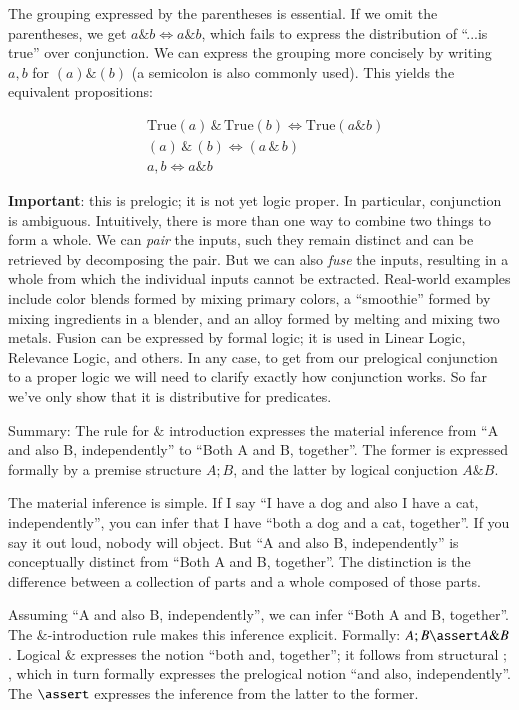 The grouping expressed by the parentheses is essential. If we omit the
parentheses, we get \(a\& b\iff a\&b\), which fails to express the
distribution of ``...is true'' over conjunction. We can express the
grouping more concisely by writing \(a,b\) for \((a)\&(b)\) (a
semicolon is also commonly used). This yields the equivalent
propositions:

\begin{align}
  & \text{True}(a)\,\&\,\text{True}(b)\iff \text{True}(a\&b) \\
  & (a)\,\&\,(b)\iff (a\,\&\,b) \\
  & a,b\iff a\&b
\end{align}

\textbf{Important}: this is prelogic; it is not yet logic proper. In
particular, conjunction is ambiguous. Intuitively, there is more than
one way to combine two things to form a whole. We can \textit{pair}
the inputs, such they remain distinct and can be retrieved by
decomposing the pair. But we can also \textit{fuse} the inputs,
resulting in a whole from which the individual inputs cannot be
extracted. Real-world examples include color blends formed by mixing
primary colors, a ``smoothie'' formed by mixing ingredients in a
blender, and an alloy formed by melting and mixing two metals. Fusion
can be expressed by formal logic; it is used in Linear Logic,
Relevance Logic, and others. In any case, to get from our prelogical
conjunction to a proper logic we will need to clarify exactly how
conjunction works. So far we've only show that it is distributive for
predicates.

Summary: The rule for \(\&\) introduction expresses the material
inference from ``A and also B, independently'' to ``Both A and B,
together''. The former is expressed formally by a premise structure
\(A ; B\), and the latter by logical conjuction \(A \& B\).

The material inference is simple. If I say ``I have a dog and also I
have a cat, independently'', you can infer that I have ``both a dog and a
cat, together''. If you say it out loud, nobody will object. But ``A
and also B, independently'' is conceptually distinct from ``Both A and B,
together''. The distinction is the difference between a collection of
parts and a whole composed of those parts.

Assuming ``A and also B, independently'', we can infer ``Both A and B,
together''. The \(\&\)-introduction rule makes this inference
explicit. Formally: \(A ; B \linfer A \& B\). Logical \(\&\)
expresses the notion ``both and, together''; it follows from
structural \(;\), which in turn formally expresses the prelogical
notion ``and also, independently''. The \(\linfer\) expresses the inference
from the latter to the former.

